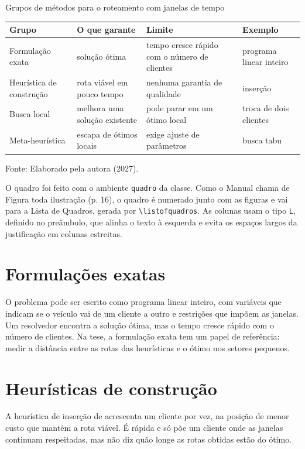 \documentclass[tid]{texufpel}
\begin{document}
\begin{quadro}[htbp]
  \caption{Grupos de métodos para o roteamento com janelas de tempo}
  \label{qua:metodos}
  \centering
  \begin{tabular}{|L{3.3cm}|L{3.8cm}|L{3.9cm}|L{3.2cm}|}
    \hline
    \textbf{Grupo} & \textbf{O que garante} & \textbf{Limite} & \textbf{Exemplo} \\ \hline
    Formulação exata & solução ótima & tempo cresce rápido com o número de clientes & programa linear inteiro \\ \hline
    Heurística de construção & rota viável em pouco tempo & nenhuma garantia de qualidade & inserção \\ \hline
    Busca local & melhora uma solução existente & pode parar em um ótimo local & troca de dois clientes \\ \hline
    Meta-heurística & escapa de ótimos locais & exige ajuste de parâmetros & busca tabu \\ \hline
  \end{tabular}
  \caption*{Fonte: Elaborado pela autora (2027).}
\end{quadro}

O quadro foi feito com o ambiente \texttt{quadro} da classe. Como o Manual
chama de Figura toda ilustração (p. 16), o quadro é numerado junto com as
figuras e vai para a Lista de Quadros, gerada por \verb|\listofquadros|. As
colunas usam o tipo \texttt{L}, definido no preâmbulo, que alinha o texto à
esquerda e evita os espaços largos da justificação em colunas estreitas.

\section{Formulações exatas}

O problema pode ser escrito como programa linear inteiro, com variáveis que
indicam se o veículo vai de um cliente a outro e restrições que impõem as
janelas. Um resolvedor encontra a solução ótima, mas o tempo cresce rápido
com o número de clientes. Na tese, a formulação exata tem um papel de
referência: medir a distância entre as rotas das heurísticas e o ótimo nos
setores pequenos.

\section{Heurísticas de construção}

A heurística de inserção de \citet{Solomon:1987:AVR} acrescenta um cliente
por vez, na posição de menor custo que mantém a rota viável. É rápida e só
põe um cliente onde as janelas continuam respeitadas, mas não diz quão longe
as rotas obtidas estão do ótimo.
\end{document}
